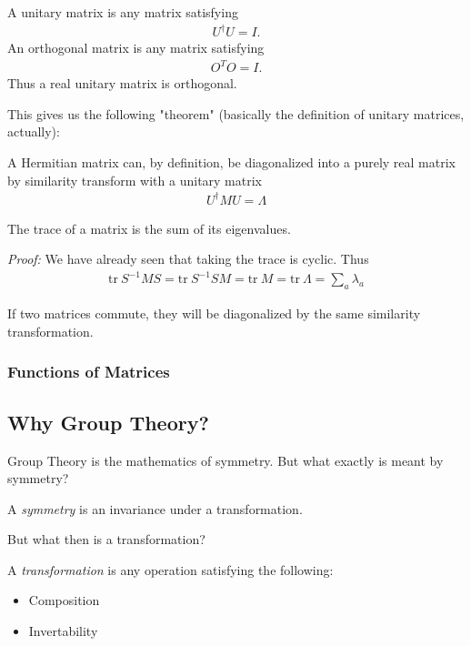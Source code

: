 \begin{definition}
    A unitary matrix is any matrix satisfying \begin{align*}
        U ^{\dagger} U = I.
    \end{align*}
    An orthogonal matrix is any matrix satisfying \begin{align*}
        O^T O = I.
    \end{align*}
    Thus a real unitary matrix is orthogonal.
\end{definition}

This gives us the following "theorem" (basically the definition of unitary matrices, actually): 
\begin{theorem}
    A Hermitian matrix can, by definition, be diagonalized into a purely real matrix by similarity transform with a unitary matrix \begin{align*}
        U ^{\dagger} M U = \Lambda 
    \end{align*}
\end{theorem}

\begin{theorem}
    The trace of a matrix is the sum of its eigenvalues.
\end{theorem}
\textit{Proof:} We have already seen that taking the trace is cyclic. Thus \begin{align*}
    \mathrm{tr}\ S^{-1} M S = \mathrm{tr}\ S^{-1} S M = \mathrm{tr}\ M = \mathrm{tr}\ \Lambda = \sum_{a} \lambda _a 
\end{align*}

\begin{theorem}
    If two matrices commute, they will be diagonalized by the same similarity transformation.
\end{theorem}

\subsubsection{Functions of Matrices}

\subsection{Why Group Theory?}
Group Theory is the mathematics of symmetry. But what exactly is meant by symmetry? \begin{definition}
    A \textit{symmetry} is an invariance under a transformation.
\end{definition}
But what then is a transformation?
\begin{definition}
    A \textit{transformation} is any operation satisfying the following: \begin{itemize}
        \item Composition
        \item Invertability
    \end{itemize}
\end{definition}

